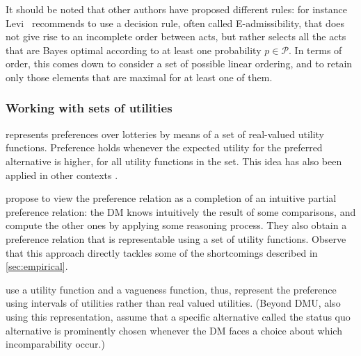 \documentclass[french, english]{llncs}
\begin{document}
	It should be noted that other authors have proposed different rules: for instance Levi~\cite{levi_enterprise_1983} recommends to use a decision rule, often called E-admissibility, that does not give rise to an incomplete order between acts, but rather selects all the acts that are Bayes optimal according to at least one probability $p \in \mathcal{P}$. In terms of order, this comes down to consider a set of possible linear ordering, and to retain only those elements that are maximal for at least one of them. 
	
	
	\subsubsection{Working with sets of utilities}
	
	\citet{dubra_expected_2004} represents preferences over lotteries by means of a set of real-valued utility functions. Preference holds whenever the expected utility for the preferred alternative is higher, for all utility functions in the set. This idea has also been applied in other contexts \citep{ok_utility_2002, eliaz_indifference_2006}.
	
	\citet{dubra_model_2002} propose to view the preference relation as a completion of an intuitive partial preference relation: the \ac{DM} knows intuitively the result of some comparisons, and compute the other ones by applying some reasoning process. They also obtain a preference relation that is representable using a set of utility functions. Observe that this approach directly tackles some of the shortcomings described in \cref{sec:empirical}.
	
	\citet{manzini_representation_2008} use a utility function and a vagueness function, thus, represent the preference using intervals of utilities rather than real valued utilities. (Beyond DMU, also using this representation, \citet{masatlioglu_rational_2005} assume that a specific alternative called the status quo alternative is prominently chosen whenever the \ac{DM} faces a choice about which incomparability occur.)
	
\end{document}
